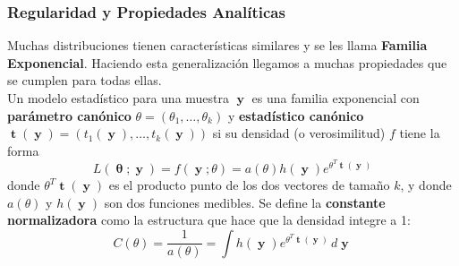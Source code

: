 \documentclass[pdftex,11pt,a4paper]{article}
\DeclareMathOperator{\muestra}{\mathbf{y}}
\DeclareMathOperator{\param}{\mathbf{\theta}}
\DeclareMathOperator{\est}{\mathbf{t}}
\begin{document}
\subsubsection{Regularidad y Propiedades Analíticas}
Muchas distribuciones tienen características similares y se les llama \textbf{Familia Exponencial}. Haciendo esta generalización llegamos a muchas propiedades que se cumplen para todas ellas.\\
Un modelo estadístico para una muestra $\muestra$ es una familia exponencial con \textbf{parámetro canónico} $\theta = (\theta_1,\ldots,\theta_k)$ y \textbf{estadístico canónico} $\est(\muestra) = (t_1(\muestra),\ldots,t_k(\muestra))$ si su densidad (o verosimilitud) $f$ tiene la forma $$L(\param;\muestra) = f(\muestra;\theta) = a(\theta)h(\muestra)e^{\theta^T \est(\muestra)}$$ donde $\theta^T \est(\muestra)$ es el producto punto de los dos vectores de tamaño $k$, y donde $a(\theta)$ y $h(\muestra)$ son dos funciones medibles.
Se define la \textbf{constante normalizadora} como la estructura que hace que la densidad integre a 1: $$C(\theta) = \dfrac{1}{a(\theta)} = \int h(\muestra)e^{\theta^T \est(\muestra)}\, d\muestra$$
\end{document}
